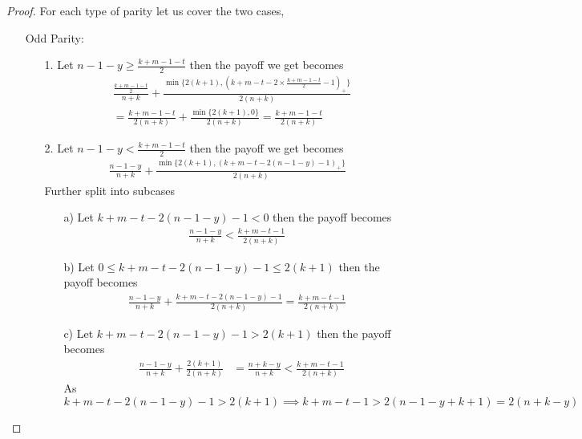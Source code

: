 \documentclass[a4paper,10pt]{article}
\newcommand{\pospart}[1]{\left( #1 \right)_{+}}
\theoremstyle{definition}
\theoremstyle{definition}
\theoremstyle{remark}
\theoremstyle{definition}
\begin{document}
\begin{proof}
For each type of parity let us cover the two cases,
\begin{itemize}
\item[Odd Parity:]
\begin{itemize}
\item[1.]Let $n-1-y \geq \frac{k+m-1-t}{2}$ then the payoff we get becomes
\begin{align*}
&\frac{\frac{k+m-1-t}{2}}{n+k}+\frac{\min \{ 2(k+1),\pospart{k+m-t-2 \times \frac{k+m-1-t}{2}-1} \}}{2(n+k)} \\
&=\frac{k+m-1-t}{2(n+k)} +\frac{\min \{ 2(k+1),0 \}}{2(n+k)}
=\frac{k+m-1-t}{2(n+k)}
\end{align*}
\item[2.]Let $n-1-y < \frac{k+m-1-t}{2}$ then the payoff we get becomes
\begin{align*}
\frac{n-1-y}{n+k}+\frac{\min \{ 2(k+1),\pospart{k+m-t-2(n-1-y)-1} \}}{2(n+k)}
\end{align*}
Further split into subcases
\begin{itemize}
\item[a)]Let $k+m-t-2(n-1-y)-1<0$ then the payoff becomes
\begin{align*}
\frac{n-1-y}{n+k}<\frac{k+m-t-1}{2(n+k)}
\end{align*}
\item[b)]Let $0 \leq k+m-t-2(n-1-y)-1 \leq 2(k+1)$ then the payoff becomes
\begin{align*}
\frac{n-1-y}{n+k} +\frac{k+m-t-2(n-1-y)-1}{2(n+k)}=\frac{k+m-t-1}{2(n+k)}
\end{align*}
\item[c)]Let $k+m-t-2(n-1-y)-1 > 2(k+1)$ then the payoff becomes
\begin{align*}
&\frac{n-1-y}{n+k}+\frac{2(k+1)}{2(n+k)}
&=\frac{n+k-y}{n+k} < \frac{k+m-t-1}{2(n+k)}
\end{align*}
As $k+m-t-2(n-1-y)-1 > 2(k+1) \implies k+m-t-1 > 2(n-1-y+k+1)=2(n+k-y)$
\end{itemize}
\end{itemize}


\end{itemize}
\end{proof}
\end{document}
